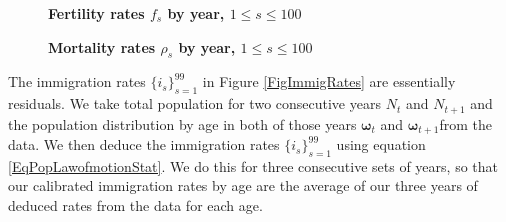 \documentclass[letterpaper,12pt]{article}
\theoremstyle{definition}
\begin{document}
  \begin{figure}[htbp]\centering \captionsetup{width=4.0in}
    \caption{\label{FigFertRates}\textbf{Fertility rates $f_s$ by year, $1\leq s\leq 100$}}
  \end{figure}

  \begin{figure}[htbp]\centering \captionsetup{width=4.0in}
    \caption{\label{FigMortRates}\textbf{Mortality rates $\rho_s$ by year, $1\leq s\leq 100$}}
  \end{figure}

  The immigration rates $\{i_s\}_{s=1}^{99}$ in Figure \ref{FigImmigRates} are essentially residuals. We take total population for two consecutive years $N_t$ and $N_{t+1}$ and the population distribution by age in both of those years $\bm{\omega}_{t}$ and $\bm{\omega}_{t+1}$from the \citet{Census:2014} data. We then deduce the immigration rates $\{i_s\}_{s=1}^{99}$ using equation \eqref{EqPopLawofmotionStat}. We do this for three consecutive sets of years, so that our calibrated immigration rates by age are the average of our three years of deduced rates from the data for each age.
\end{document}
